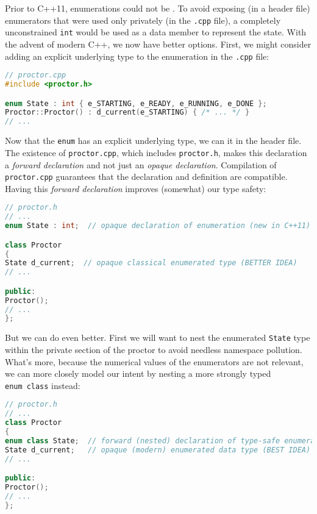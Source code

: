 \noindent Prior to C++11, enumerations could not be . To
avoid exposing (in a header file) enumerators that were used only
privately (in the \lstinline!.cpp! file), a completely unconstrained
\lstinline!int! would be used as a data member to represent the state. With
the advent of modern C++, we now have better options. First, we might
consider adding an explicit underlying type to the enumeration in the
\lstinline!.cpp! file:

\begin{lstlisting}[language=C++]
// proctor.cpp
#include <proctor.h>

enum State : int { e_STARTING, e_READY, e_RUNNING, e_DONE };
Proctor::Proctor() : d_current(e_STARTING) { /* ... */ }
// ...
\end{lstlisting}

\noindent Now that the  \lstinline!enum! has an explicit
underlying type, we can  it in the header file.
The existence of \lstinline!proctor.cpp!, which includes
\lstinline!proctor.h!, makes this declaration a \emph{forward declaration}
and not just an \emph{opaque declaration}. Compilation of
\lstinline!proctor.cpp! guarantees that the declaration and definition are
compatible. Having this \emph{forward declaration} improves (somewhat)
our type safety:

\begin{lstlisting}[language=C++]
// proctor.h
// ...
enum State : int;  // opaque declaration of enumeration (new in C++11)

class Proctor
{
State d_current;  // opaque classical enumerated type (BETTER IDEA)
// ...

public:
Proctor();
// ...
};
\end{lstlisting}

\noindent But we can do even better. First we will want to nest the enumerated
\lstinline!State! type within the private section of the proctor to avoid
needless namespace pollution. What's more, because the numerical values
of the enumerators are not relevant, we can more closely model our
intent by nesting a more strongly typed \lstinline!enum!~\lstinline!class! instead:

\begin{lstlisting}[language=C++]
// proctor.h
// ...
class Proctor
{
enum class State;  // forward (nested) declaration of type-safe enumeration
State d_current;   // opaque (modern) enumerated data type (BEST IDEA)
// ...

public:
Proctor();
// ...
};
\end{lstlisting}

